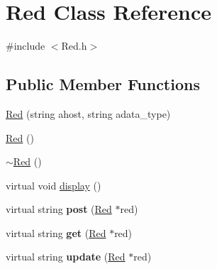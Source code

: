 \hypertarget{classRed}{}\section{Red Class Reference}
\label{classRed}


{\ttfamily \#include $<$Red.\+h$>$}

\subsection*{Public Member Functions}
\begin{DoxyCompactItemize}
\item 
\hyperlink{classRed_aa4cd39fc9ca3a5b43d7a8c944bd30124}{Red} (string ahost, string adata\+\_\+type)
\item 
\hyperlink{classRed_ac010a2bcec6571efb9ab8caa00914e56}{Red} ()
\item 
\hyperlink{classRed_adaa579fa7b2358a20cc1051f8a8c6a01}{$\sim$\+Red} ()
\item 
virtual void \hyperlink{classRed_a494a0aafe657ad69c8b0bd31d740e7f6}{display} ()
\item 
virtual string {\bfseries post} (\hyperlink{classRed}{Red} $\ast$red)\hypertarget{classRed_adb216f7ed08bb0e324c2a2f66d8a88ad}{}\label{classRed_adb216f7ed08bb0e324c2a2f66d8a88ad}

\item 
virtual string {\bfseries get} (\hyperlink{classRed}{Red} $\ast$red)\hypertarget{classRed_ac609c9203f5c6e507e3d37aa9878629b}{}\label{classRed_ac609c9203f5c6e507e3d37aa9878629b}

\item 
virtual string {\bfseries update} (\hyperlink{classRed}{Red} $\ast$red)\hypertarget{classRed_a8fd4c6f3052e311443e68a4644011152}{}\label{classRed_a8fd4c6f3052e311443e68a4644011152}


\end{DoxyCompactItemize}
